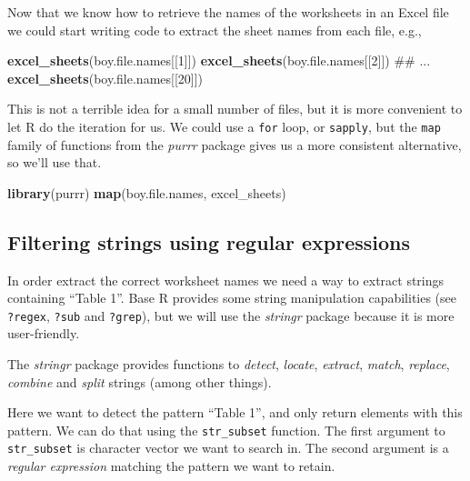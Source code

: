 \documentclass[]{book}
\newenvironment{Shaded}{\begin{snugshade}}{\end{snugshade}}
\newcommand{\KeywordTok}[1]{\textcolor[rgb]{0.13,0.29,0.53}{\textbf{#1}}}
\newcommand{\DecValTok}[1]{\textcolor[rgb]{0.00,0.00,0.81}{#1}}
\newcommand{\NormalTok}[1]{#1}
\begin{document}
Now that we know how to retrieve the names of the worksheets in an Excel
file we could start writing code to extract the sheet names from each
file, e.g.,

\begin{Shaded}
\begin{Highlighting}[]
\KeywordTok{excel_sheets}\NormalTok{(boy.file.names[[}\DecValTok{1}\NormalTok{]])}
\KeywordTok{excel_sheets}\NormalTok{(boy.file.names[[}\DecValTok{2}\NormalTok{]])}
\NormalTok{## ...}
\KeywordTok{excel_sheets}\NormalTok{(boy.file.names[[}\DecValTok{20}\NormalTok{]])}
\end{Highlighting}
\end{Shaded}

This is not a terrible idea for a small number of files, but it is more
convenient to let R do the iteration for us. We could use a \texttt{for}
loop, or \texttt{sapply}, but the \texttt{map} family of functions from
the \emph{purrr} package gives us a more consistent alternative, so
we'll use that.

\begin{Shaded}
\begin{Highlighting}[]
\KeywordTok{library}\NormalTok{(purrr)}
\KeywordTok{map}\NormalTok{(boy.file.names, excel_sheets)}
\end{Highlighting}
\end{Shaded}

\subsection{Filtering strings using regular
expressions}\label{filtering-strings-using-regular-expressions}

In order extract the correct worksheet names we need a way to extract
strings containing ``Table 1''. Base R provides some string manipulation
capabilities (see \texttt{?regex}, \texttt{?sub} and \texttt{?grep}),
but we will use the \emph{stringr} package because it is more
user-friendly.

The \emph{stringr} package provides functions to \emph{detect},
\emph{locate}, \emph{extract}, \emph{match}, \emph{replace},
\emph{combine} and \emph{split} strings (among other things).

Here we want to detect the pattern ``Table 1'', and only return elements
with this pattern. We can do that using the \texttt{str\_subset}
function. The first argument to \texttt{str\_subset} is character vector
we want to search in. The second argument is a \emph{regular expression}
matching the pattern we want to retain.
\end{document}
